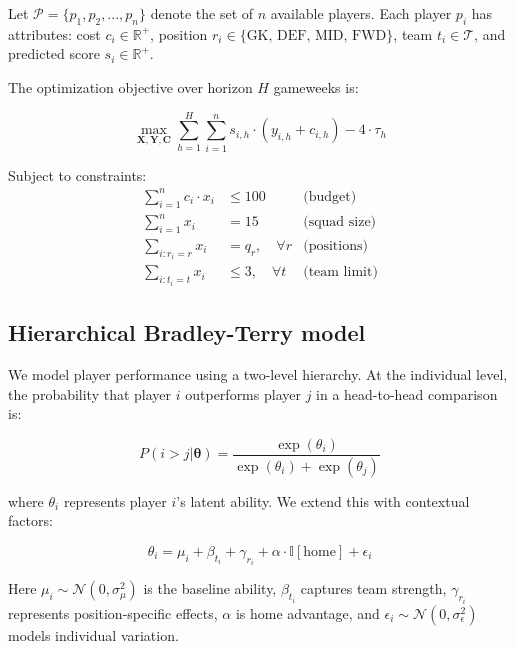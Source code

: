 \documentclass[10pt,a4paper,twocolumn]{article}
\begin{document}
Let $\mathcal{P} = \{p_1, p_2, ..., p_n\}$ denote the set of $n$ available players. Each player $p_i$ has attributes: cost $c_i \in \mathbb{R}^+$, position $r_i \in \{\text{GK, DEF, MID, FWD}\}$, team $t_i \in \mathcal{T}$, and predicted score $s_i \in \mathbb{R}^+$.

The optimization objective over horizon $H$ gameweeks is:

\begin{equation}
\max_{\mathbf{X}, \mathbf{Y}, \mathbf{C}} \sum_{h=1}^{H} \sum_{i=1}^{n} s_{i,h} \cdot (y_{i,h} + c_{i,h}) - 4 \cdot \tau_h
\end{equation}

Subject to constraints:
\begin{align}
\sum_{i=1}^{n} c_i \cdot x_i &\leq 100 & \text{(budget)} \\
\sum_{i=1}^{n} x_i &= 15 & \text{(squad size)} \\
\sum_{i: r_i = r} x_i &= q_r, \quad \forall r & \text{(positions)} \\
\sum_{i: t_i = t} x_i &\leq 3, \quad \forall t & \text{(team limit)}
\end{align}

\subsection*{Hierarchical Bradley-Terry model}

We model player performance using a two-level hierarchy. At the individual level, the probability that player $i$ outperforms player $j$ in a head-to-head comparison is:

\begin{equation}
P(i > j | \boldsymbol{\theta}) = \frac{\exp(\theta_i)}{\exp(\theta_i) + \exp(\theta_j)}
\end{equation}

where $\theta_i$ represents player $i$'s latent ability. We extend this with contextual factors:

\begin{equation}
\theta_i = \mu_i + \beta_{t_i} + \gamma_{r_i} + \alpha \cdot \mathbb{I}[\text{home}] + \epsilon_i
\end{equation}

Here $\mu_i \sim \mathcal{N}(0, \sigma^2_\mu)$ is the baseline ability, $\beta_{t_i}$ captures team strength, $\gamma_{r_i}$ represents position-specific effects, $\alpha$ is home advantage, and $\epsilon_i \sim \mathcal{N}(0, \sigma^2_\epsilon)$ models individual variation.
\end{document}
